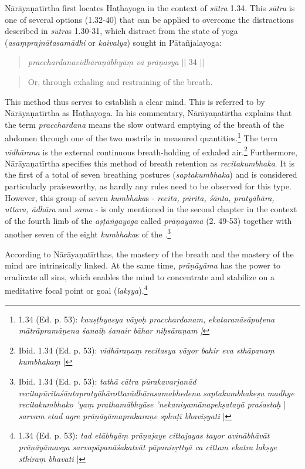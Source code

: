 Nārāyaṇatīrtha first locates Haṭhayoga in the context of \textit{sūtra} 1.34. This \textit{sūtra} is one of several options (1.32-40) that can be applied to overcome the distractions described in \textit{sūtra}s 1.30-31, which distract from the state of yoga (\textit{asaṃprajnātasamādhi} or \textit{kaivalya}) sought in Pātañjalayoga:
\begin{quote} \textit{pracchardanavidhāraṇābhyāṃ vā prāṇasya} || 34 || \end{quote}
\begin{quote} Or, through exhaling and restraining of the breath. \end{quote}

This method thus serves to establish a clear mind. This is referred to by Nārāyaṇatīrtha as Haṭhayoga. In his commentary, Nārāyaṇatīrtha explains that the term \textit{pracchardana} means the slow outward emptying of the breath of the abdomen through one of the two nostrils in measured quantities.\footnote{ 1.34 (Ed. p. 53): \textit{kauṣṭhyasya vāyoḥ pracchardanam, ekataranāsāpuṭena mātrāpramāṇena śanaiḥ śanair bāhar niḥsāraṇam |}} The term \textit{vidhārana} is the external continuous breath-holding of exhaled air.\footnote{Ibid. 1.34 (Ed. p. 53): \textit{vidhāraṇaṃ recitasya vāyor bahir eva sthāpanaṃ kumbhakaṃ} |} Furthermore, Nārāyaṇatīrtha specifies this method of breath retention as \textit{recitakumbhaka}. It is the first of a total of seven breathing postures (\textit{saptakumbhaka}) and is considered particularly praiseworthy, as hardly any rules need to be observed for this type. However, this group of seven \textit{kumbhaka}s - \textit{recita, pūrita, śānta, pratyāhāra, uttara, ādhāra} and \textit{sama} - is only mentioned in the second chapter in the context of the fourth limb of the \textit{aṣṭāṅgayoga} called \textit{prāṇāyāma} (2. 49-53) together with another seven of the eight \textit{kumbhaka}s of the .\footnote{Ibid. 1.34 (Ed. p. 53): \textit{tathā cātra pūrakavarjanād recitapūritaśāntapratyāhārottarādhārasamabhedena saptakumbhakeṣu madhye recitakumbhako 'yaṃ prathamābhyāse 'nekaniyamānapekṣatayā praśastaḥ} | \textit{sarvam etad agre prāṇāyāmaprakaraṇe sphuṭī bhaviṣyati} |}

According to Nārāyaṇatīrthas, the mastery of the breath and the mastery of the mind are intrinsically linked. At the same time, \textit{prāṇāyāma} has the power to eradicate all sins, which enables the mind to concentrate and stabilize on a meditative focal point or goal (\textit{lakṣya}).\footnote{ 1.34 (Ed. p. 53): \textit{tad etābhyāṃ prāṇajaye cittajayas tayor avinābhāvāt prāṇāyāmasya sarvapāpanāśakatvāt pāpanivṛttyā ca cittam ekatra lakṣye sthiraṃ bhavati} |}

